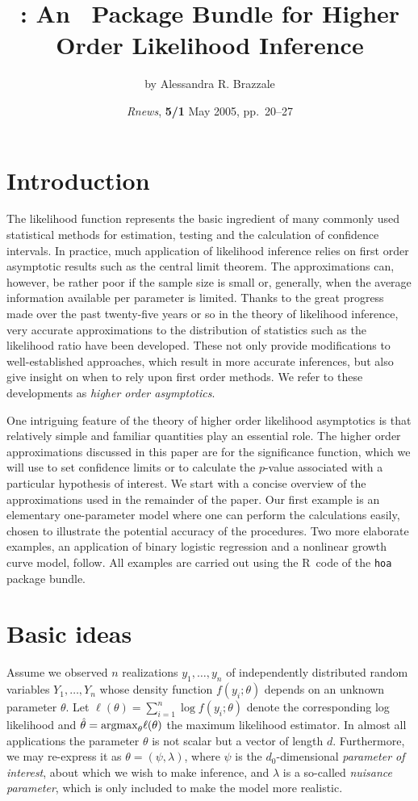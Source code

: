 \documentclass[a4paper,11pt]{article}
\title{\code{hoa}: An \R\ Package Bundle for Higher Order Likelihood Inference}
\author{by Alessandra R. Brazzale}
\date{\emph{Rnews}, \textbf{5/1} May 2005, pp.~20--27}
\def\R{{\sf R}}
\def\code{\texttt}
\begin{document}
\maketitle

\section*{Introduction}
%
The likelihood function represents the basic ingredient of many commonly used statistical methods for estimation, testing and the calculation of confidence intervals.  In practice, much application of likelihood inference relies on first order asymptotic results such as the central limit theorem.  The approximations can, however, be rather poor if the sample size is small or, generally, when the average information available per parameter is limited.  Thanks to the great progress made over the past twenty-five years or so in the theory of likelihood inference, very accurate approximations to the distribution of statistics such as the likelihood ratio have been developed.  These not only provide modifications to well-established approaches, which result in more accurate inferences, but also give insight on when to rely upon first order methods.  We refer to these developments as \emph{higher order asymptotics}.  

One intriguing feature of the theory of higher order likelihood asymptotics is that relatively simple and familiar quantities play an essential role.  The higher order approximations discussed in this paper are for the significance function, which we will use to set confidence limits or to calculate the $p$-value associated with a particular hypothesis of interest.  We start with a concise overview of the approximations used in the remainder of the paper.  Our first example is an elementary one-parameter model where one can perform the calculations easily, chosen to illustrate the potential accuracy of the procedures.  Two more elaborate examples, an application of binary logistic regression and a nonlinear growth curve model, follow.  All examples are carried out using the \R\ code of the \code{hoa} package bundle. 


\section*{Basic ideas}
%
Assume we observed $n$ realizations $y_1, \ldots, y_n$ of independently distributed random variables $Y_1, \ldots, Y_n$ whose density function $f(y_i;\theta)$ depends on an unknown parameter $\theta$.  Let $\ell(\theta) = \sum_{i=1}^{n}\log f(y_i;\theta)$ denote the corresponding log likelihood and $\hat\theta = {\rm argmax}_\theta\ell(\theta)$ the maximum likelihood estimator.  In almost all applications the parameter $\theta$ is not scalar but a vector of length $d$.  Furthermore, we may re-express it as $\theta = (\psi,\lambda)$, where $\psi$ is the $d_0$-dimensional \emph{parameter of interest}, about which we wish to make inference, and $\lambda$ is a so-called \emph{nuisance parameter}, which is only included to make the model more realistic.  
\end{document}
